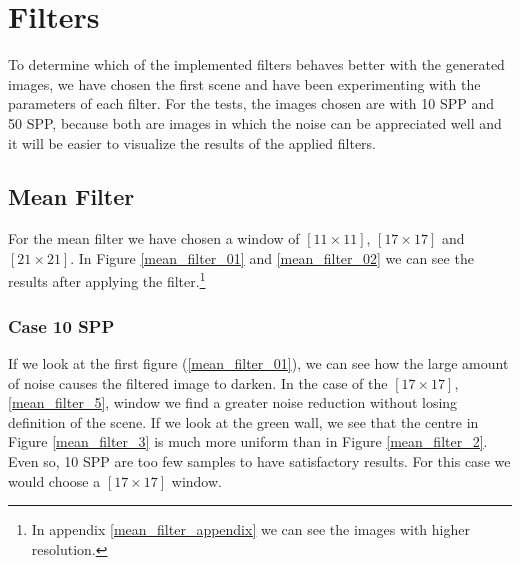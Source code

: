 \documentclass[titlepage,12pt]{report}
\begin{document}
\section{Filters}

To determine which of the implemented filters behaves better with the generated images, we have chosen the first scene and have been experimenting with the parameters of each filter. For the tests, the images chosen are with 10 SPP and 50 SPP, because both are images in which the noise can be appreciated well and it will be easier to visualize the results of the applied filters.

\subsection{Mean Filter}

For the mean filter we have chosen a window of $[11 \times 11]$, $[17 \times 17]$ and $[21 \times 21]$. In Figure \ref{mean_filter_01} and \ref{mean_filter_02} we can see the results after applying the filter.\footnote{In appendix \ref{mean_filter_appendix} we can see the images with higher resolution.}

\subsubsection{Case 10 SPP}

If we look at the first figure (\ref{mean_filter_01}), we can see how the large amount of noise causes the filtered image to darken. In the case of the $[17\times 17]$, \ref{mean_filter_5}, window we find a greater noise reduction without losing definition of the scene. If we look at the green wall, we see that the centre in Figure \ref{mean_filter_3} is much more uniform than in Figure \ref{mean_filter_2}. Even so, 10 SPP are too few samples to have satisfactory results. For this case we would choose a $[17\times 17]$ window.
\end{document}
